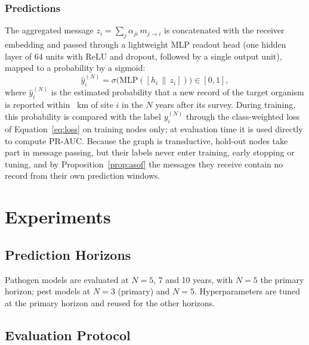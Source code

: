 \documentclass[a4paper,fleqn]{cas-sc}
\begin{document}
\begin{itemize}[leftmargin=1.4em]
\end{itemize}

\subsubsection{Predictions}
\label{sec:predictions}

The aggregated message $z_i = \sum_{j} \alpha_{ji}\, m_{j \to i}$ is concatenated with the receiver embedding and passed through a lightweight MLP readout head (one hidden layer of 64 units with ReLU and dropout, followed by a single output unit), mapped to a probability by a sigmoid:
\begin{equation}
\hat{y}_i^{(N)} = \sigma\big(\mathrm{MLP}([h_i \,\|\, z_i])\big) \in [0,1],
\label{eq:readout}
\end{equation}
where $\hat{y}_i^{(N)}$ is the estimated probability that a new record of the target organism is reported within \bufferKm~km of site $i$ in the $N$ years after its survey. During training, this probability is compared with the label $y_i^{(N)}$ through the class-weighted loss of Equation~\eqref{eq:loss} on training nodes only; at evaluation time it is used directly to compute PR-AUC. Because the graph is transductive, hold-out nodes take part in message passing, but their labels never enter training, early stopping or tuning, and by Proposition~\ref{prop:asof} the messages they receive contain no record from their own prediction windows.

\section{Experiments}
\label{sec:expsetup}

\subsection{Prediction Horizons}

Pathogen models are evaluated at $N = 5$, 7 and 10 years, with $N = 5$ the primary horizon; pest models at $N = 3$ (primary) and $N = 5$. Hyperparameters are tuned at the primary horizon and reused for the other horizons.

\subsection{Evaluation Protocol}
\label{sec:protocol}
\end{document}
